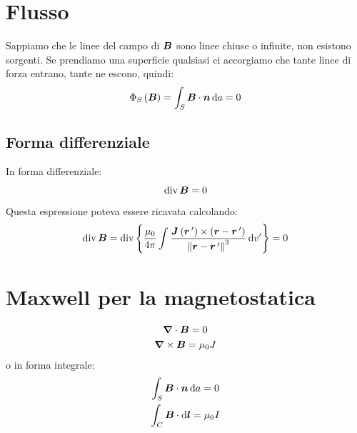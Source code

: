 \section{Flusso}
Sappiamo che le linee del campo di $\boldsymbol{B}$ sono linee chiuse o infinite, non esistono sorgenti. Se prendiamo una superficie qualsiasi ci accorgiamo che tante linee di forza entrano, tante ne escono, quindi:
\begin{equation}
\Phi_S\left(\boldsymbol{B}\right)=\int_S\boldsymbol{B}\cdot\boldsymbol{n}\,\mathrm{d} a=0
\end{equation}
\subsection{Forma differenziale}
In forma differenziale:
\begin{equation}
\operatorname{div}\boldsymbol{B}=0
\end{equation}
Questa espressione poteva essere ricavata calcolando:
\begin{equation*}\operatorname{div}\boldsymbol{B}=\operatorname{div} \left\{\frac{\mu_0}{4\pi}\int\frac{\boldsymbol{J}\left(\boldsymbol{r}\,'\right)\times\left(\boldsymbol{r}-\boldsymbol{r}\,'\right)}{\left\lVert\boldsymbol{r}-\boldsymbol{r}\,'\right\rVert^3}\,\mathrm{d} v'\right\}=0\end{equation*}
\section{Maxwell per la magnetostatica}
\begin{gather}
\boldsymbol{\nabla}\cdot\boldsymbol{B}=0\\
\boldsymbol{\nabla}\times\boldsymbol{B}=\mu_0 J
\end{gather}
o in forma integrale:
\begin{gather}
\int_S\boldsymbol{B}\cdot\boldsymbol{n}\,\mathrm{d} a=0\\
\int_C\boldsymbol{B}\cdot\mathrm{d} \boldsymbol{l}=\mu_0 I
\end{gather}

